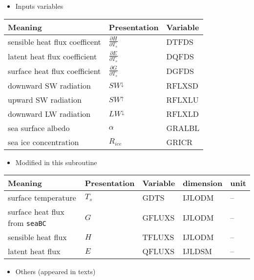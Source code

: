 \begin{itemize}
\tightlist
\item
  Inputs variables
\end{itemize}

\setlength\LTleft{0pt}\setlength\LTright{0pt}\begin{longtable}[]{@{}lll@{}}
\toprule\relax
Meaning & Presentation & Variable \\
\midrule\relax
\endhead
sensible heat flux coefficent & \(\frac{\partial H}{\partial T_s}\) &
DTFDS \\
latent heat flux coefficient & \(\frac{\partial E}{\partial T_s}\) &
DQFDS \\
surface heat flux coefficient & \(\frac{\partial G}{\partial T_s}\) &
DGFDS \\
downward SW radiation & \(SW^\downarrow\) & RFLXSD \\
upward SW radiation & \(SW^\uparrow\) & RFLXLU \\
downward LW radiation & \(LW^\downarrow\) & RFLXLD \\
sea surface albedo & \(\alpha\) & GRALBL \\
sea ice concentration & \(R_{ice}\) & GRICR \\
\bottomrule
\end{longtable}

\begin{itemize}
\tightlist
\item
  Modified in this subroutine
\end{itemize}

\setlength\LTleft{0pt}\setlength\LTright{0pt}\begin{longtable}[]{@{}lllll@{}}
\toprule\relax
Meaning & Presentation & Variable & dimension & unit \\
\midrule\relax
\endhead
surface temperature & \(T_s\) & GDTS & IJLODM & -- \\
surface heat flux from \texttt{seaBC} & \(G\) & GFLUXS & IJLODM & -- \\
sensible heat flux & \(H\) & TFLUXS & IJLODM & -- \\
latent heat flux & \(E\) & QFLUXS & IJLDSM & -- \\
\bottomrule
\end{longtable}

\begin{itemize}
\tightlist
\item
  Others (appeared in texts)
\end{itemize}

